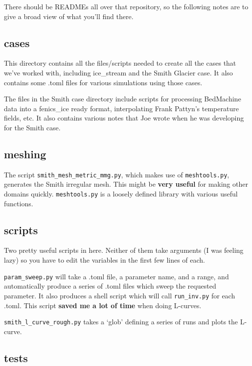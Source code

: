 \documentclass[11pt, reqno, nocenter]{article}
\begin{document}
There should be READMEs all over that repository, so the following notes are to give a broad view of what you'll find there.

\subsection{cases}

This directory contains all the files/scripts needed to create all the cases that we've worked with, including ice\_stream and the Smith Glacier case. It also contains some .toml files for various simulations using those cases.

The files in the Smith case directory include scripts for processing BedMachine data into a fenics\_ice ready format, interpolating Frank Pattyn's temperature fields, etc. It also contains various notes that Joe wrote when he was developing for the Smith case.

\subsection{meshing}

The script {\tt smith\_mesh\_metric\_mmg.py}, which makes use of {\tt meshtools.py}, generates the Smith irregular mesh. This might be \textbf{very useful} for making other domains quickly. {\tt meshtools.py} is a loosely defined library with various useful functions.

\subsection{scripts}

Two pretty useful scripts in here. Neither of them take arguments (I was feeling lazy) so you have to edit the variables in the first few lines of each.

{\tt param\_sweep.py} will take a .toml file, a parameter name, and a range, and automatically produce a series of .toml files which sweep the requested parameter. It also produces a shell script which will call {\tt run\_inv.py} for each .toml. This script \textbf{saved me a lot of time} when doing L-curves.

{\tt smith\_l\_curve\_rough.py} takes a `glob' defining a series of runs and plots the L-curve.

\subsection{tests}
\end{document}
